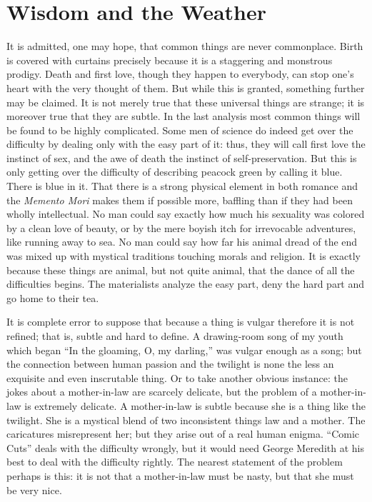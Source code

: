 \documentclass{book}
\begin{document}
\chapter{Wisdom and the Weather}
\label{chapter-15}
It is admitted, one may hope, that common things are never commonplace. Birth is covered with curtains precisely because it is a staggering and monstrous prodigy. Death and first love, though they happen to everybody, can stop one’s heart with the very thought of them. But while this is granted, something further may be claimed. It is not merely true that these universal things are strange; it is moreover true that they are subtle. In the last analysis most common things will be found to be highly complicated. Some men of science do indeed get over the difficulty by dealing only with the easy part of it: thus, they will call first love the instinct of sex, and the awe of death the instinct of self-preservation. But this is only getting over the difficulty of describing peacock green by calling it blue. There is blue in it. That there is a strong physical element in both romance and the \emph{Memento Mori} makes them if possible more, baffling than if they had been wholly intellectual. No man could say exactly how much his sexuality was colored by a clean love of beauty, or by the mere boyish itch for irrevocable adventures, like running away to sea. No man could say how far his animal dread of the end was mixed up with mystical traditions touching morals and religion. It is exactly because these things are animal, but not quite animal, that the dance of all the difficulties begins. The materialists analyze the easy part, deny the hard part and go home to their tea.

It is complete error to suppose that because a thing is vulgar therefore it is not refined; that is, subtle and hard to define. A drawing-room song of my youth which began “In the gloaming, O, my darling,” was vulgar enough as a song; but the connection between human passion and the twilight is none the less an exquisite and even inscrutable thing. Or to take another obvious instance: the jokes about a mother-in-law are scarcely delicate, but the problem of a mother-in-law is extremely delicate. A mother-in-law is subtle because she is a thing like the twilight. She is a mystical blend of two inconsistent things law and a mother. The caricatures misrepresent her; but they arise out of a real human enigma. “Comic Cuts” deals with the difficulty wrongly, but it would need George Meredith at his best to deal with the difficulty rightly. The nearest statement of the problem perhaps is this: it is not that a mother-in-law must be nasty, but that she must be very nice.
\end{document}
